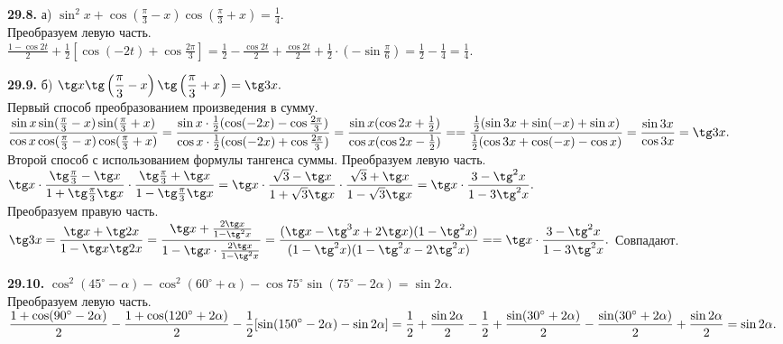 \documentclass[a5paper,10pt]{article}
\begin{document}
\medskip
\noindent
{\bf 29.8.} а) $\displaystyle \sin^2x+\cos\left(\frac{\pi}{3}-x\right)
\cos\left(\frac{\pi}{3}+x\right)=\frac14.$\\[3pt]
Преобразуем левую часть.\\[3pt]
$\displaystyle \frac{1-\cos2t}{2}+\frac12\left[\cos(-2t)+\cos\frac{2\pi}{3}\right]=
\frac12-\frac{\cos2t}{2}+\frac{\cos2t}{2}+\frac12\cdot\left(-\sin\frac{\pi}{6}\right)=
\frac12-\frac14=\frac14.$

\medskip
\noindent
{\bf 29.9.} б) $\displaystyle \tg x\tg\left(\frac{\pi}{3}-x\right)
\tg\left(\frac{\pi}{3}+x\right)=\tg3x.$\\[3pt]
Первый способ преобразованием произведения в сумму.\\[3pt]
$\displaystyle \frac{\sin x\sin(\frac{\pi}{3}-x)\sin(\frac{\pi}{3}+x)}{\cos x\cos(\frac{\pi}{3}-x)\cos(\frac{\pi}{3}+x)}=
\frac{\sin x\cdot\frac12(\cos(-2x)-\cos\frac{2\pi}{3})}
{\cos x\cdot\frac12(\cos(-2x)+\cos\frac{2\pi}{3})}=
\frac{\sin x(\cos2x+\frac12)}{\cos x(\cos2x-\frac12)}=\\[3pt]
=\frac{\frac12(\sin3x+\sin(-x)+\sin x)}
{\frac12(\cos3x+\cos(-x)-\cos x)}=\frac{\sin3x}{\cos3x}=\tg3x.$\\[3pt]
Второй способ с использованием формулы тангенса суммы. Преобразуем левую часть.\\[3pt]
$\displaystyle \tg x\cdot\frac{\tg\frac{\pi}{3}-\tg x}{1+\tg\frac{\pi}{3}\tg x}\cdot
\frac{\tg\frac{\pi}{3}+\tg x}{1-\tg\frac{\pi}{3}\tg x}=
\tg x\cdot\frac{\sqrt3-\tg x}{1+\sqrt3\tg x}\cdot\frac{\sqrt3+\tg x}{1-\sqrt3\tg x}=
\tg x\cdot\frac{3-\tg^2x}{1-3\tg^2x}.$\\[3pt]
Преобразуем правую часть.\\[3pt]
$\displaystyle \tg3x=\frac{\tg x+\tg2x}{1-\tg x\tg2x}=
\frac{\tg x+\frac{2\tg x}{1-\tg^2x}}{1-\tg x\cdot\frac{2\tg x}{1-\tg^2x}}=\frac{(\tg x-\tg^3x+2\tg x)(1-\tg^2x)}{(1-\tg^2x)(1-\tg^2x-2\tg^2x)}=\\[3pt]
=\tg x\cdot\frac{3-\tg^2x}{1-3\tg^2x}.$ Совпадают.

\medskip
\noindent
{\bf 29.10.} $\cos^2(45^\circ-\alpha)-\cos^2(60^\circ+\alpha)-
\cos75^\circ\sin(75^\circ-2\alpha)=\sin2\alpha.$\\[3pt]
Преобразуем левую часть.\\[3pt]
$\displaystyle \frac{1+\cos(90^\circ-2\alpha)}{2}-\frac{1+\cos(120^\circ+2\alpha)}{2}-
\frac12[\sin(150^\circ-2\alpha)-\sin2\alpha]=\\[3pt]
\frac12+\frac{\sin2\alpha}{2}-\frac12+\frac{\sin(30^\circ+2\alpha)}{2}-
\frac{\sin(30^\circ+2\alpha)}{2}+\frac{\sin2\alpha}{2}=\sin2\alpha.$
\end{document}

